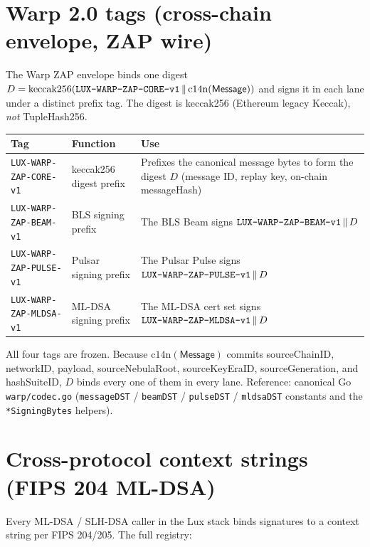 \documentclass[11pt,a4paper]{article}
\begin{document}
\section{Warp 2.0 tags (cross-chain envelope, ZAP wire)}

The Warp ZAP envelope binds one digest $D = \mathrm{keccak256}(\text{\texttt{LUX-WARP-ZAP-CORE-v1}} \,\|\, \mathrm{c14n}(\mathsf{Message}))$ and signs it in each lane under a distinct prefix tag. The digest is keccak256 (Ethereum legacy Keccak), \emph{not} TupleHash256.

\begin{tabularx}{\textwidth}{@{}p{}p{}X@{}}
  \toprule
  \textbf{Tag} & \textbf{Function} & \textbf{Use} \\
  \midrule
  \texttt{LUX-WARP-ZAP-CORE-v1} & keccak256 digest prefix & Prefixes the canonical message bytes to form the digest $D$ (message ID, replay key, on-chain messageHash) \\
  \texttt{LUX-WARP-ZAP-BEAM-v1} & BLS signing prefix & The BLS Beam signs $\text{\texttt{LUX-WARP-ZAP-BEAM-v1}}\,\|\,D$ \\
  \texttt{LUX-WARP-ZAP-PULSE-v1} & Pulsar signing prefix & The Pulsar Pulse signs $\text{\texttt{LUX-WARP-ZAP-PULSE-v1}}\,\|\,D$ \\
  \texttt{LUX-WARP-ZAP-MLDSA-v1} & ML-DSA signing prefix & The ML-DSA cert set signs $\text{\texttt{LUX-WARP-ZAP-MLDSA-v1}}\,\|\,D$ \\
  \bottomrule
\end{tabularx}

All four tags are frozen. Because $\mathrm{c14n}(\mathsf{Message})$ commits sourceChainID, networkID, payload, sourceNebulaRoot, sourceKeyEraID, sourceGeneration, and hashSuiteID, $D$ binds every one of them in every lane. Reference: canonical Go \texttt{warp/codec.go} (\texttt{messageDST} / \texttt{beamDST} / \texttt{pulseDST} / \texttt{mldsaDST} constants and the \texttt{*SigningBytes} helpers).

\section{Cross-protocol context strings (FIPS 204 ML-DSA)}

Every ML-DSA / SLH-DSA caller in the Lux stack binds signatures to a context string per FIPS 204/205. The full registry:
\end{document}
